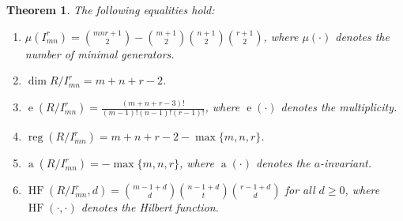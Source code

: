 \documentclass[12pt]{amsart}
\numberwithin{equation}{section}
\newtheorem{theorem}{Theorem}[section]
\theoremstyle{definition}
\DeclareMathOperator{\HF}{HF}
\DeclareMathOperator{\reg}{reg}
\DeclareMathOperator{\e}{e}
\DeclareMathOperator{\ainv}{a}
\begin{document}
\begin{theorem} 
\label{thm: invariants}
The following equalities hold: 
\begin{enumerate}

\smallskip
\item $\mu(I_{mn}^r)
={mnr+1\choose 2}-{m+1\choose 2}{n+1\choose 2} {r+1\choose 2}$, where $\mu(\cdot)$ denotes the number of minimal generators.
\smallskip
\item $\dim R/I_{mn}^r=m+n+r-2$.
\smallskip
\item  $\e(R/I_{mn}^r)=\frac{(m+n+r-3)!}{(m-1)!(n-1)!(r-1)!}$, where $\e(\cdot)$ denotes the multiplicity. 
\smallskip
\item   $\reg(R/I_{mn}^r)=m+n+r-2-\max\{m,n,r\}$.
\smallskip
\item $\ainv(R/I_{mn}^r)=-\max\{m,n,r\}$, where $\ainv(\cdot)$ denotes the $a$-invariant.
    \medskip
    \item $\HF(R/I_{mn}^r, d)=\binom{m-1+d}{d}\binom{n-1+d}{t}\binom{r-1+d}{d}$ for all $d\geq 0$, where $\HF(\cdot, \cdot)$ denotes the Hilbert function.
\end{enumerate}
\end{theorem}
\end{document}
